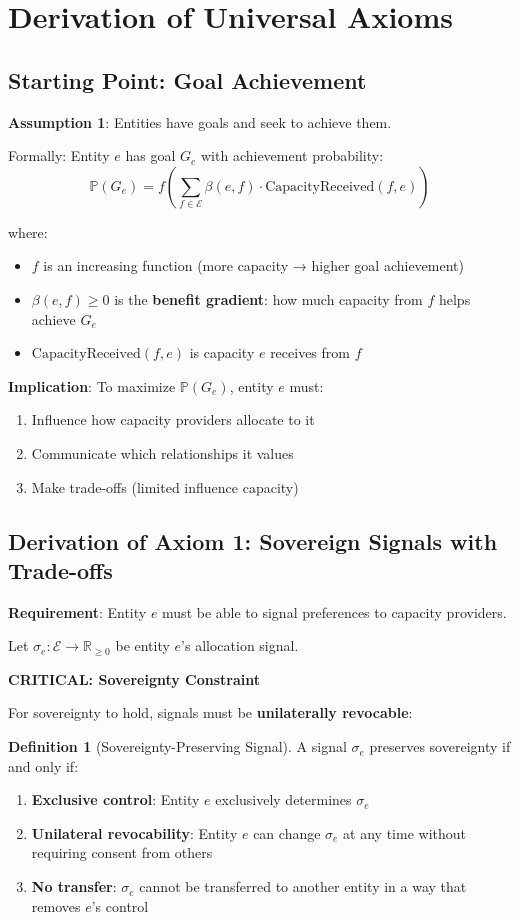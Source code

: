 \documentclass[11pt,a4paper]{article}
\theoremstyle{definition}
\newtheorem{definition}[theorem]{Definition}
\theoremstyle{remark}
\newcommand{\E}{\mathcal{E}}
\begin{document}
\section{Derivation of Universal Axioms}

\subsection{Starting Point: Goal Achievement}

\textbf{Assumption 1}: Entities have goals and seek to achieve them.

Formally: Entity $e$ has goal $G_e$ with achievement probability:
\[ \mathbb{P}(G_e) = f\left(\sum_{f \in \E} \beta(e,f) \cdot \text{CapacityReceived}(f,e)\right) \]

where:
\begin{itemize}
\item $f$ is an increasing function (more capacity → higher goal achievement)
\item $\beta(e,f) \ge 0$ is the \textbf{benefit gradient}: how much capacity from $f$ helps achieve $G_e$
\item $\text{CapacityReceived}(f,e)$ is capacity $e$ receives from $f$
\end{itemize}

\textbf{Implication}: To maximize $\mathbb{P}(G_e)$, entity $e$ must:
\begin{enumerate}
\item Influence how capacity providers allocate to it
\item Communicate which relationships it values
\item Make trade-offs (limited influence capacity)
\end{enumerate}

\subsection{Derivation of Axiom 1: Sovereign Signals with Trade-offs}

\textbf{Requirement}: Entity $e$ must be able to signal preferences to capacity providers.

Let $\sigma_e: \E \to \mathbb{R}_{\ge 0}$ be entity $e$'s allocation signal.

\textbf{CRITICAL: Sovereignty Constraint}

For sovereignty to hold, signals must be \textbf{unilaterally revocable}:

\begin{definition}[Sovereignty-Preserving Signal]
A signal $\sigma_e$ preserves sovereignty if and only if:
\begin{enumerate}
\item \textbf{Exclusive control}: Entity $e$ exclusively determines $\sigma_e$
\item \textbf{Unilateral revocability}: Entity $e$ can change $\sigma_e$ at any time without requiring consent from others
\item \textbf{No transfer}: $\sigma_e$ cannot be transferred to another entity in a way that removes $e$'s control
\end{enumerate}
\end{definition}
\end{document}
